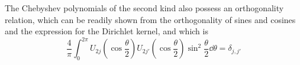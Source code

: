 \documentclass[12pt]{article}
\begin{document}
	The Chebyshev polynomials of the second kind also possess an orthogonality relation, which can be readily shown from the orthogonality of sines and cosines and the expression for the Dirichlet kernel, and which is
	\begin{equation} \label{chebyshev_orthogonality}
	\frac{4}{\pi}\int_0^{2\pi} U_{2j}\left(\cos{\frac{\theta}{2}}\right)U_{2j'}\left(\cos{\frac{\theta}{2}}\right) \sin^2{\frac{\theta}{2}}\dd \theta = \delta_{j,j'}
	\end{equation}
	
	\begin{thebibliography}{10}



\end{thebibliography}	
	
\end{document}
